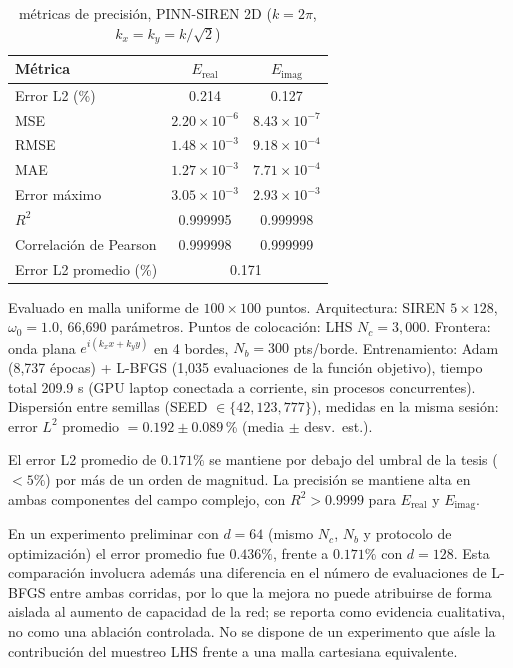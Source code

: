 \begin{table}[t]
\centering
\footnotesize
\renewcommand{\arraystretch}{1.2}
\setlength{\tabcolsep}{4pt}
\caption{métricas de precisión, PINN-SIREN 2D ($k = 2\pi$, $k_x = k_y = k/\sqrt{2}$)}
\label{tab:resultados2d}
\begin{tabular}{@{}lcc@{}}
\hline
Métrica & $E_{\mathrm{real}}$ & $E_{\mathrm{imag}}$ \\
\hline
Error L2 (\%)          & 0.214 & 0.127 \\
MSE                    & $2.20 \times 10^{-6}$ & $8.43 \times 10^{-7}$ \\
RMSE                   & $1.48 \times 10^{-3}$ & $9.18 \times 10^{-4}$ \\
MAE                    & $1.27 \times 10^{-3}$ & $7.71 \times 10^{-4}$ \\
Error máximo           & $3.05 \times 10^{-3}$ & $2.93 \times 10^{-3}$ \\
$R^2$                  & 0.999995 & 0.999998 \\
Correlación de Pearson & 0.999998 & 0.999999 \\
\hline
Error L2 promedio (\%) & \multicolumn{2}{c}{0.171} \\
\hline
\end{tabular}
\end{table}
\noindent\footnotesize Evaluado en malla uniforme de $100 \times 100$ puntos.
Arquitectura: SIREN $5 \times 128$, $\omega_0 = 1.0$, 66{,}690 parámetros.
Puntos de colocación: LHS $N_c = 3{,}000$.
Frontera: onda plana $e^{i(k_x x + k_y y)}$ en 4 bordes, $N_b = 300$ pts/borde.
Entrenamiento: Adam (8{,}737 épocas) + L-BFGS (1{,}035 evaluaciones de la
función objetivo), tiempo total 209.9 s (GPU laptop conectada a corriente,
sin procesos concurrentes).
Dispersión entre semillas (SEED $\in \{42, 123, 777\}$), medidas en la
misma sesión:
error $L^2$ promedio $= 0.192 \pm 0.089$\,\% (media $\pm$ desv.\ est.).
\normalsize

El error L2 promedio de $0.171\%$ se mantiene por debajo del umbral de la tesis
($< 5\%$) por más de un orden de magnitud. La precisión se mantiene alta en ambas
componentes del campo complejo, con $R^2 > 0.9999$ para $E_{\mathrm{real}}$ y
$E_{\mathrm{imag}}$.

En un experimento preliminar con $d = 64$ (mismo $N_c$, $N_b$ y protocolo de
optimización) el error promedio fue $0.436\%$, frente a $0.171\%$ con
$d = 128$. Esta comparación involucra además una diferencia en el número de
evaluaciones de L-BFGS entre ambas corridas, por lo que la mejora no puede
atribuirse de forma aislada al aumento de capacidad de la red; se reporta
como evidencia cualitativa, no como una ablación controlada. No se dispone
de un experimento que aísle la contribución del muestreo LHS frente a una
malla cartesiana equivalente.


